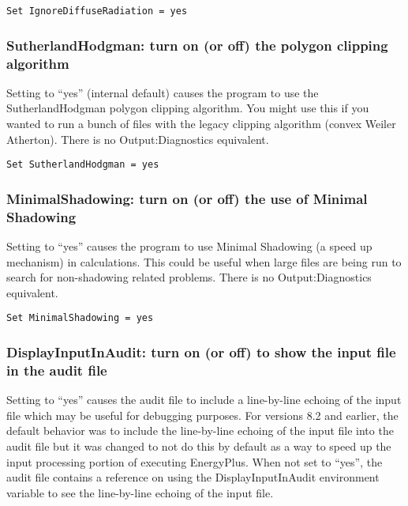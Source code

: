 \begin{lstlisting}
Set IgnoreDiffuseRadiation = yes
\end{lstlisting}

\subsubsection{SutherlandHodgman: turn on (or off) the polygon clipping algorithm}\label{sutherlandhodgman-turn-on-or-off-the-polygon-clipping-algorithm}

Setting to ``yes'' (internal default) causes the program to use the SutherlandHodgman polygon clipping algorithm. You might use this if you wanted to run a bunch of files with the legacy clipping algorithm (convex Weiler Atherton). There is no Output:Diagnostics equivalent.

\begin{lstlisting}
Set SutherlandHodgman = yes
\end{lstlisting}

\subsubsection{MinimalShadowing: turn on (or off) the use of Minimal Shadowing}\label{minimalshadowing-turn-on-or-off-the-use-of-minimal-shadowing}

Setting to ``yes'' causes the program to use Minimal Shadowing (a speed up mechanism) in calculations. This could be useful when large files are being run to search for non-shadowing related problems. There is no Output:Diagnostics equivalent.

\begin{lstlisting}
Set MinimalShadowing = yes
\end{lstlisting}

\subsubsection{DisplayInputInAudit: turn on (or off) to show the input file in the audit file}\label{displayinputinaudit-turn-on-or-off-to-show-the-input-file-in-the-audit-file}

Setting to ``yes'' causes the audit file to include a line-by-line echoing of the input file which may be useful for debugging purposes. For versions 8.2 and earlier, the default behavior was to include the line-by-line echoing of the input file into the audit file but it was changed to not do this by default as a way to speed up the input processing portion of executing EnergyPlus. When not set to ``yes'', the audit file contains a reference on using the DisplayInputInAudit environment variable to see the line-by-line echoing of the input file.

